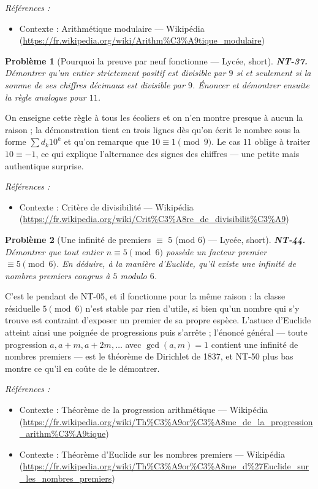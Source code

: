 \documentclass[11pt]{article}
\newtheorem{problem}{Problème}
\newenvironment{refs}{\par\small\noindent\emph{Références :}\begin{itemize}\setlength\itemsep{0pt}}{\end{itemize}\normalsize}
\begin{document}
\begin{refs}
\item Contexte : Arithmétique modulaire --- Wikipédia (\url{https://fr.wikipedia.org/wiki/Arithm%C3%A9tique_modulaire})
\end{refs}

\bigskip

\begin{problem}[{Pourquoi la preuve par neuf fonctionne --- Lycée, short}]
\textbf{NT-37.} Démontrer qu'un entier strictement positif est divisible par $ 9 $ si et seulement si la somme de ses chiffres décimaux est divisible par $ 9 $. Énoncer et démontrer ensuite la règle analogue pour $ 11 $.
\end{problem}

\noindent On enseigne cette règle à tous les écoliers et on n'en montre presque à aucun la raison ; la démonstration tient en trois lignes dès qu'on écrit le nombre sous la forme $ \sum d_k 10^k $ et qu'on remarque que $ 10 \equiv 1 \pmod 9 $. Le cas $ 11 $ oblige à traiter $ 10 \equiv -1 $, ce qui explique l'alternance des signes des chiffres --- une petite mais authentique surprise.

\begin{refs}
\item Contexte : Critère de divisibilité --- Wikipédia (\url{https://fr.wikipedia.org/wiki/Crit%C3%A8re_de_divisibilit%C3%A9})
\end{refs}

\bigskip

\begin{problem}[{Une infinité de premiers $\equiv$ 5 (mod 6) --- Lycée, short}]
\textbf{NT-44.} Démontrer que tout entier $ n \equiv 5 \pmod 6 $ possède un
facteur premier $ \equiv 5 \pmod 6 $. En déduire, à la manière d'Euclide, qu'il existe une infinité
de nombres premiers congrus à $ 5 $ modulo $ 6 $.
\end{problem}

\noindent C'est le pendant de NT-05, et il fonctionne pour la même raison : la classe
résiduelle $ 5 \pmod 6 $ n'est stable par rien d'utile, si bien qu'un nombre qui s'y trouve est
contraint d'exposer un premier de sa propre espèce. L'astuce d'Euclide atteint ainsi une poignée de
progressions puis s'arrête ; l'énoncé général --- toute progression $ a, a+m, a+2m, \ldots $ avec
$ \gcd(a,m)=1 $ contient une infinité de nombres premiers --- est le théorème de Dirichlet de 1837,
et NT-50 plus bas montre ce qu'il en coûte de le démontrer.

\begin{refs}
\item Contexte : Théorème de la progression arithmétique --- Wikipédia (\url{https://fr.wikipedia.org/wiki/Th%C3%A9or%C3%A8me_de_la_progression_arithm%C3%A9tique})
\item Contexte : Théorème d'Euclide sur les nombres premiers --- Wikipédia (\url{https://fr.wikipedia.org/wiki/Th%C3%A9or%C3%A8me_d%27Euclide_sur_les_nombres_premiers})
\end{refs}
\end{document}
